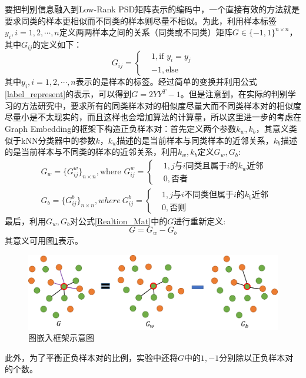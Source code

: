 要把判别信息融入到Low-Rank PSD矩阵表示的编码中，一个直接有效的方法就是要求同类的样本更相似而不同类的样本则尽量不相似。为此，利用样本标签$y_{i},i=1,2,\cdots,n$定义两两样本之间的关系（同类或不同类）矩阵$G\in\{-1,1\}^{n\times n}$，其中$G_{ij}$的定义如下：
\begin{equation}
\label{Realtion_Mat}
G_{ij}=\left\{
\begin{split}
&1,\text{if }y_i=y_j\\
&-1,\text{else}
\end{split}
\right.
\end{equation}
其中$y_i,i=1,2,\cdots,n$表示的是样本的标签。经过简单的变换并利用公式\ref{label_represent}的表示，可以得到$G=2YY^{T}-1$。但是注意到，在实际的判别学习的方法研究中，要求所有的同类样本对的相似度尽量大而不同类样本对的相似度尽量小是不太现实的，而且这样也会增加算法的计算量，所以这里进一步的考虑在Graph Embedding\cite{Graph_Embeding}的框架下构造正负样本对：首先定义两个参数$k_w,k_b$，其意义类似于kNN分类器中的参数$k$，$k_w$描述的是当前样本与同类样本的近邻关系，$k_b$描述的是当前样本与不同类的样本的近邻关系，利用$k_w,k_b$定义$G_w,G_b$:
\begin{equation}
\label{GE_Gw_Gb}
\begin{split}
&G_w=\{G^{w}_{ij}\}_{n \times n},\text{where }G^{w}_{ij}=\left\{
\begin{split}
&1,\text{$j$与$i$同类且属于$i$的$k_w$近邻}\\
&0,\text{否者}
\end{split}
\right.\\
&G_b=\{G^{b}_{ij}\}_{n \times n},where~G^{b}_{ij}=\left\{
\begin{split}
&1,\text{$j$与$i$不同类但属于$i$的$k_b$近邻}\\
&0,\text{否则}
\end{split}
\right.
\end{split}
\end{equation}
最后，利用$G_w,G_b$对公式\ref{Realtion_Mat}中的$G$进行重新定义:
\begin{equation}
\label{Graph_Mat}
G=G_w-G_b
\end{equation}
其意义可用图\ref{fig:Graph_Embedding}表示。
\begin{figure}[hbt]
	\centering
	\includegraphics[width=\linewidth]{source/Graph_Embedding.png}
	\caption{图嵌入框架示意图}
	\label{fig:Graph_Embedding}
\end{figure}
此外，为了平衡正负样本对的比例，实验中还将$G$中的$1,-1$分别除以正负样本对的个数。

